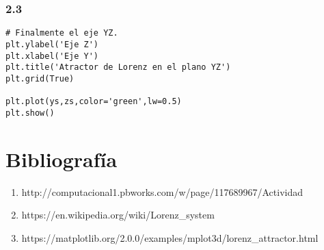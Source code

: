 \documentclass[12pt,a4paper]{article}
\begin{document}
\subsubsection{2.3}
\begin{verbatim}
# Finalmente el eje YZ.
plt.ylabel('Eje Z')
plt.xlabel('Eje Y')
plt.title('Atractor de Lorenz en el plano YZ')
plt.grid(True)

plt.plot(ys,zs,color='green',lw=0.5)
plt.show()
\end{verbatim}


\section{Bibliografía}

\begin{enumerate}
\item http://computacional1.pbworks.com/w/page/117689967/Actividad%

\item https://en.wikipedia.org/wiki/Lorenz\_system

\item https://matplotlib.org/2.0.0/examples/mplot3d/lorenz\_attractor.html

\end{enumerate}
\end{document}
